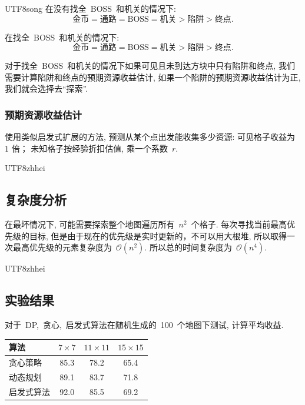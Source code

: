 \documentclass[10.5pt,compsoc]{CjC}
\theoremstyle{mystyle}
\begin{document}
\begin{CJK*}{UTF8}{song}
在没有找全~BOSS~和机关的情况下:
$$
\textrm{金币}=\textrm{通路}=\textrm{BOSS}=\textrm{机关}>\textrm{陷阱}>\textrm{终点}.
$$

在找全~BOSS~和机关的情况下:
$$
\textrm{金币}=\textrm{通路}=\textrm{BOSS}=\textrm{机关}>\textrm{陷阱}>\textrm{终点}.
$$

对于找全~BOSS~和机关的情况下如果可见且未到达方块中只有陷阱和终点,
我们需要计算陷阱和终点的预期资源收益估计, 如果一个陷阱的预期资源收益估计为正,
我们就会选择去“探索”.

\subsubsection{预期资源收益估计}

使用类似启发式扩展的方法, 预测从某个点出发能收集多少资源:
可见格子收益为 $1$ 倍；
未知格子按经验折扣估值, 乘一个系数~$r$.

\begin{CJK*}{UTF8}{zhhei}\subsection{复杂度分析}\end{CJK*}

在最坏情况下, 可能需要探索整个地图遍历所有~$n^2$~个格子.
每次寻找当前最高优先级的目标, 但是由于现在的优先级是实时更新的，不可以用大根堆,
所以取得一次最高优先级的元素复杂度为~$\mathcal{O}(n^2)$.
所以总的时间复杂度为~$\mathcal{O}(n^4)$.
    
\begin{CJK*}{UTF8}{zhhei}\subsection{实验结果}\end{CJK*}

对于~DP,~贪心,~启发式算法在随机生成的~100~个地图下测试, 计算平均收益.
\vskip 30mm

\begin{table}[htbp]
\vspace{-2.5mm}
\begin{center}
\begin{tabular}{lccc}
\toprule
算法 & $7\times7$ & $11 \times 11$ & $15 \times 15$ \\  %
\hline
贪心策略 & 85.3 & 78.2 & 65.4 \\
动态规划 & 89.1 & 83.7 & 71.8 \\
启发式算法 & 92.0 & 85.5 & 69.2 \\
\bottomrule
\end{tabular}
\label{tab1}
\end{center}
\end{table}

\end{CJK*}
\end{document}
